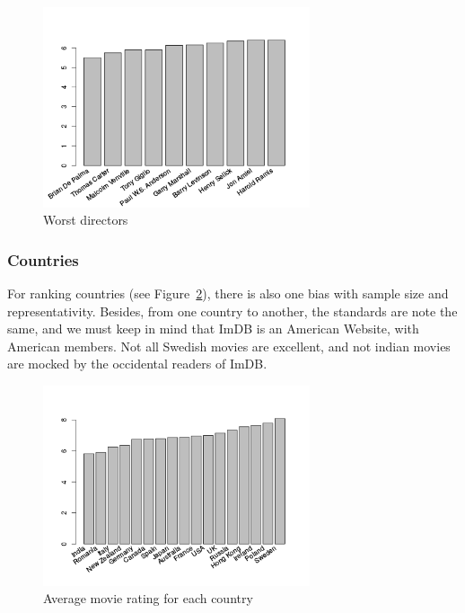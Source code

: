 \begin{figure}[!h]
\begin{center}
\includegraphics[width=0.70\textwidth]{../src/pre-processing/stats/results/worstDirectors.png}
\end{center}
\caption{Worst directors}
\label{fig:worstDirectors}
\end{figure}

\newpage
\subsubsection{Countries}
\label{subs:Countries}

For ranking countries (see Figure~\ref{fig:rateByCountry}), there is also one bias with sample size and representativity.
Besides, from one country to another, the standards are note the same, and we must keep in mind that ImDB is an American Website, with American members.
Not all Swedish movies are excellent, and not indian movies are mocked by the occidental readers of ImDB.

\begin{figure}[!h]
\begin{center}
\includegraphics[width=0.70\textwidth]{../src/pre-processing/stats/results/rateByCountry.png}
\end{center}
\caption{Average movie rating for each country}
\label{fig:rateByCountry}
\end{figure}

